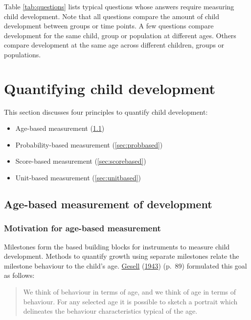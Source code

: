 \documentclass[
]{book}
\providecommand{\tightlist}{%
  \setlength{\itemsep}{0pt}\setlength{\parskip}{0pt}}
\begin{document}
Table \ref{tab:questions} lists typical questions whose answers require measuring child development. Note that all questions compare the amount of child development between groups or time points. A few questions compare development for the same child, group or population at different ages. Others compare development at the same age across different children, groups or populations.

\newpage

\hypertarget{ch:threeways}{%
\chapter{Quantifying child development}\label{ch:threeways}}

This section discusses four principles to quantify child development:

\begin{itemize}
\tightlist
\item
  Age-based measurement (\ref{sec:agebased})
\item
  Probability-based measurement (\ref{sec:probbased})
\item
  Score-based measurement (\ref{sec:scorebased})
\item
  Unit-based measurement (\ref{sec:unitbased})
\end{itemize}

\hypertarget{sec:agebased}{%
\section{Age-based measurement of development}\label{sec:agebased}}

\hypertarget{motivation-for-age-based-measurement}{%
\subsection{Motivation for age-based measurement}\label{motivation-for-age-based-measurement}}

Milestones form the based building blocks for instruments to measure child development. Methods to quantify growth using separate milestones relate the milestone behaviour to the child's age. \protect\hyperlink{ref-gesell1943}{Gesell} (\protect\hyperlink{ref-gesell1943}{1943}) (p.~89) formulated this goal as follows:

\begin{quote}
We think of behaviour in terms of age, and we think of age in terms of behaviour. For any selected age it is possible to sketch a portrait which delineates the behaviour characteristics typical of the age.
\end{quote}
\end{document}
